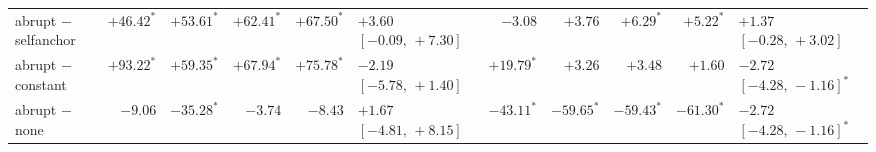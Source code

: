 \begin{tabular}{@{}lrrrr l rrrr l@{}}
abrupt $-$ selfanchor    & $+46.42^{*}$ & $+53.61^{*}$ & $+62.41^{*}$ & $+67.50^{*}$ & $+3.60$ $[-0.09,\,+7.30]$ & $-3.08$ & $+3.76$ & $+6.29^{*}$ & $+5.22^{*}$ & $+1.37$ $[-0.28,\,+3.02]$\\
abrupt $-$ constant      & $+93.22^{*}$ & $+59.35^{*}$ & $+67.94^{*}$ & $+75.78^{*}$ & $-2.19$ $[-5.78,\,+1.40]$ & $+19.79^{*}$ & $+3.26$ & $+3.48$ & $+1.60$ & $\mathbf{-2.72}$ $[-4.28,\,-1.16]^*$\\
abrupt $-$ none          & $-9.06$ & $-35.28^{*}$ & $-3.74$ & $-8.43$ & $+1.67$ $[-4.81,\,+8.15]$ & $-43.11^{*}$ & $-59.65^{*}$ & $-59.43^{*}$ & $-61.30^{*}$ & $\mathbf{-2.72}$ $[-4.28,\,-1.16]^*$\\
\bottomrule
\end{tabular}
